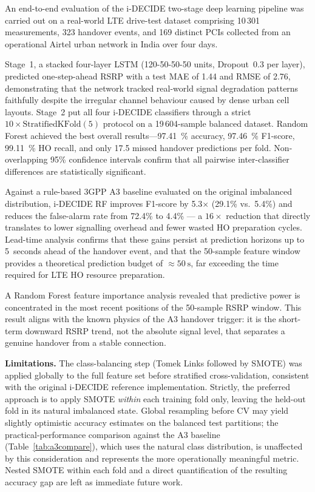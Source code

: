 \documentclass[journal]{IEEEtran}
\begin{document}
An end-to-end evaluation of the i-DECIDE two-stage deep learning pipeline
was carried out on a real-world LTE drive-test dataset comprising 10\,301
measurements, 323 handover events, and 169 distinct PCIs collected from
an operational Airtel urban network in India over four days.

Stage~1, a stacked four-layer LSTM (120-50-50-50 units, Dropout~0.3
per layer), predicted one-step-ahead RSRP with a test MAE of
\SI{1.44}{\dBm} and RMSE of \SI{2.76}{\dBm}, demonstrating that the
network tracked real-world signal degradation patterns faithfully
despite the irregular channel behaviour caused by dense urban cell
layouts. Stage~2 put all four i-DECIDE classifiers through a strict
$10\times\text{StratifiedKFold}(5)$ protocol on a 19\,604-sample balanced
dataset. Random Forest achieved the best overall results---\SI{97.41}{\percent}
accuracy, \SI{97.46}{\percent} F1-score, \SI{99.11}{\percent} HO recall,
and only 17.5 missed handover predictions per fold. Non-overlapping 95\%
confidence intervals confirm that all pairwise inter-classifier differences
are statistically significant.

Against a rule-based 3GPP A3 baseline evaluated on the original
imbalanced distribution, i-DECIDE RF improves F1-score by 5.3$\times$
(29.1\% vs.\ 5.4\%) and reduces the false-alarm rate from 72.4\% to
4.4\% --- a $16\times$ reduction that directly translates to lower
signalling overhead and fewer wasted HO preparation cycles. Lead-time
analysis confirms that these gains persist at prediction horizons up to
5~seconds ahead of the handover event, and that the 50-sample feature
window provides a theoretical prediction budget of $\approx\SI{50}{\second}$,
far exceeding the time required for LTE HO resource preparation.

A Random Forest feature importance analysis revealed that predictive
power is concentrated in the most recent positions of the 50-sample
RSRP window. This result aligns with the known physics of the A3 handover
trigger: it is the short-term downward RSRP trend, not the absolute signal
level, that separates a genuine handover from a stable connection.

\textbf{Limitations.}
The class-balancing step (Tomek Links followed by SMOTE) was applied
globally to the full feature set before stratified cross-validation,
consistent with the original i-DECIDE reference implementation. Strictly,
the preferred approach is to apply SMOTE \emph{within} each training
fold only, leaving the held-out fold in its natural imbalanced state.
Global resampling before CV may yield slightly optimistic accuracy
estimates on the balanced test partitions; the practical-performance
comparison against the A3 baseline (Table~\ref{tab:a3compare}), which
uses the natural class distribution, is unaffected by this consideration
and represents the more operationally meaningful metric. Nested SMOTE
within each fold and a direct quantification of the resulting accuracy
gap are left as immediate future work.
\end{document}
